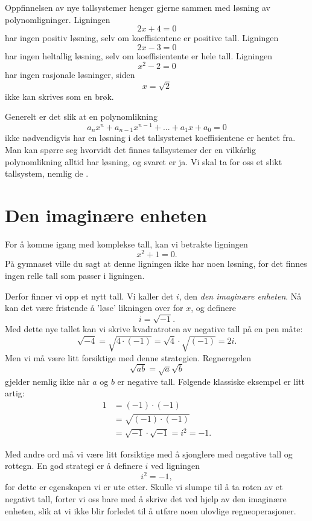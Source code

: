

\label{ch:komplekse-tall}

Oppfinnelsen av nye tallsystemer henger gjerne sammen med løsning av polynomligninger. Ligningen 
\[
2x+4=0
\]
har ingen positiv løsning, selv om koeffisientene er positive tall. 
Ligningen
\[
2x-3=0
\]
har ingen heltallig løsning, selv om koeffisientente er hele tall.
Ligningen
\[
x^2-2=0
\]
har ingen rasjonale løsninger, siden
\[
x=\sqrt{2}
\]
ikke kan skrives som en brøk. 

Generelt er det slik at en polynomlikning
\[
a_nx^n+a_{n-1}x^{n-1}+...+a_1x+a_0=0
\]
ikke nødvendigvis har en løsning i det tallsystemet koeffisientene er hentet fra. 
Man kan spørre seg hvorvidt det finnes tallsystemer der en vilkårlig polynomlikning alltid har løsning, 
og svaret er ja. 
Vi skal ta for oss et slikt tallsystem, nemlig de .


\section*{Den imaginære enheten}
For å komme igang med komplekse tall, kan vi betrakte ligningen
\[
x^2+1=0.
\]
På gymnaset ville du sagt at denne ligningen ikke har noen løsning, for det finnes ingen relle tall som passer i ligningen. 

Derfor finner vi opp et nytt tall. Vi kaller det $i$, den \emph{den imaginære enheten}. 
Nå kan det være fristende å 'løse' likningen over for $x$, og definere
\[
i=\sqrt{-1}.
\]
Med dette nye tallet kan vi skrive kvadratroten av negative tall på en pen måte:
\begin{equation*}
\sqrt{-4}=\sqrt{4\cdot (-1)}=\sqrt{4}\cdot \sqrt{(-1)}=2i.
\end{equation*}
Men vi må være litt forsiktige med denne strategien. 
Regneregelen
\[
\sqrt{ab}=\sqrt{a}\sqrt{b}
\]
gjelder nemlig ikke når $a$ og $b$ er negative tall.
Følgende klassiske eksempel er litt artig:
\begin{align*}
1&=(-1)\cdot(-1)\\&=\sqrt{(-1)\cdot (-1)}\\&=\sqrt{-1}\cdot \sqrt{ -1}=i^2=-1.
\end{align*}

Med andre ord må vi være litt forsiktige med å sjonglere med negative tall og rottegn.
En god strategi er å definere $i$ ved ligningen
\[
i^2=-1,
\]
for dette er egenskapen vi er ute etter. 
Skulle vi slumpe til å ta roten av et negativt tall, 
forter vi oss bare med å skrive det ved hjelp av den imaginære enheten, 
slik at vi ikke blir forledet til å utføre noen ulovlige regneoperasjoner.

